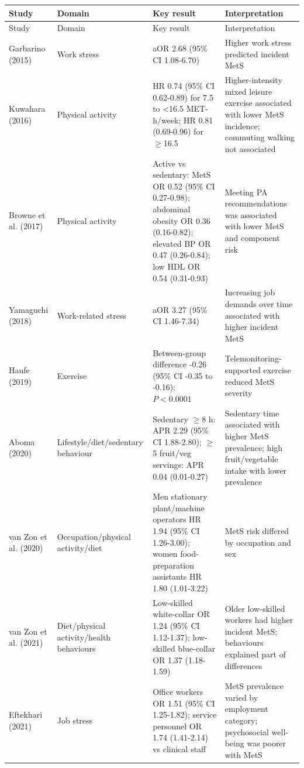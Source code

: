 \begin{longtable}{p{} p{} p{} p{}}
\toprule
Study & Domain & Key result & Interpretation \\
\midrule
\endfirsthead
\toprule
Study & Domain & Key result & Interpretation \\
\midrule
\endhead
    Garbarino (2015) & Work stress & aOR 2.68 (95\% CI 1.08-6.70) & Higher work stress predicted incident MetS \\
    Kuwahara (2016) & Physical activity & HR 0.74 (95\% CI 0.62-0.89) for 7.5 to <16.5 MET-h/week; HR 0.81 (0.69-0.96) for $\geq$16.5 & Higher-intensity mixed leisure exercise associated with lower MetS incidence; commuting walking not associated \\
    Browne et al. (2017) & Physical activity & Active vs sedentary: MetS OR 0.52 (95\% CI 0.27-0.98); abdominal obesity OR 0.36 (0.16-0.82); elevated BP OR 0.47 (0.26-0.84); low HDL OR 0.54 (0.31-0.93) & Meeting PA recommendations was associated with lower MetS and component risk \\
    Yamaguchi (2018) & Work-related stress & aOR 3.27 (95\% CI 1.46-7.34) & Increasing job demands over time associated with higher incident MetS \\
    Haufe (2019) & Exercise & Between-group difference -0.26 (95\% CI -0.35 to -0.16); \(P < 0.0001\) & Telemonitoring-supported exercise reduced MetS severity \\
    Aboma (2020) & Lifestyle/diet/sedentary behaviour & Sedentary $\geq$8 h: APR 2.29 (95\% CI 1.88-2.80); $\geq$5 fruit/veg servings: APR 0.04 (0.01-0.27) & Sedentary time associated with higher MetS prevalence; high fruit/vegetable intake with lower prevalence \\
    van Zon et al. (2020) & Occupation/physical activity/diet & Men stationary plant/machine operators HR 1.94 (95\% CI 1.26-3.00); women food-preparation assistants HR 1.80 (1.01-3.22) & MetS risk differed by occupation and sex \\
    van Zon et al. (2021) & Diet/physical activity/health behaviours & Low-skilled white-collar OR 1.24 (95\% CI 1.12-1.37); low-skilled blue-collar OR 1.37 (1.18-1.59) & Older low-skilled workers had higher incident MetS; behaviours explained part of differences \\
    Eftekhari (2021) & Job stress & Office workers OR 1.51 (95\% CI 1.25-1.82); service personnel OR 1.74 (1.41-2.14) vs clinical staff & MetS prevalence varied by employment category; psychosocial well-being was poorer with MetS \\

\end{longtable}
